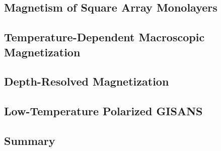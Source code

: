 \documentclass[\main/dresen_thesis.tex]{subfiles}
\renewcommand{\thisPath}{\main/chapters/monolayers/magnetism}
\begin{document}
  \subsection{Magnetism of Square Array Monolayers}
  \label{sec:monolayers:magneticStructure}


  
  \FloatBarrier

  \subsection{Temperature-Dependent Macroscopic Magnetization}
    
    \FloatBarrier

  \subsection{Depth-Resolved Magnetization}
    
    \FloatBarrier

  \subsection{Low-Temperature Polarized GISANS}
    
    \FloatBarrier

  \subsection{Summary}
    
    \FloatBarrier
\end{document}
